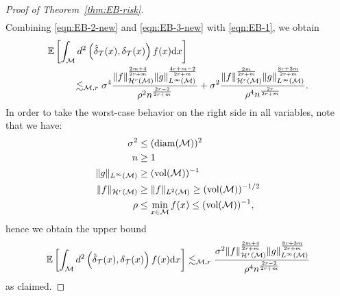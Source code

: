 \documentclass[preprint]{imsart}
\theoremstyle{plain}
\theoremstyle{definition}
\newcommand{\Ebb}{\mathbb{E}}
\newcommand{\Mcal}{\mathcal{M}}
\newcommand{\Hcal}{\mathcal{H}}
\newcommand{\diff}{\textnormal{d}}
\newcommand{\vol}{\textnormal{vol}}
\newcommand{\T}{\mathcal{T}}
\DeclareMathOperator{\diam}{diam}
\begin{document}
\begin{appendix}
\begin{proof}[Proof of Theorem~\ref{thm:EB-risk}]
\begin{equation}
\begin{split}
        \end{split}
    \end{equation}
    Combining \eqref{eqn:EB-2-new} and \eqref{eqn:EB-3-new} with \eqref{eqn:EB-1}, we obtain
    \begin{equation*}
        \begin{split}
        \Ebb&\left[\int_{\Mcal}d^2\left(\hat{\delta}_{\T}(x),\delta_{\T}(x)\right)f(x)\diff x\right] \\
        &\qquad\lesssim_{\Mcal,r}
        \sigma^4
        \frac{\|f\|_{\Hcal^{r}(\Mcal)}^{\frac{2m+4}{2r+m}}
        \|g\|_{L^{\infty}(\Mcal)}^{\frac{4r+m-2}{2r+m}}}{\rho^2n^{\frac{2r-2}{2r+m}}}
        +
        \sigma^2
        \frac{\|f\|_{\Hcal^{r}(\Mcal)}^{\frac{2m}{2r+m}}
        \|g\|_{L^{\infty}(\Mcal)}^{\frac{8r+3m}{2r+m}}}{\rho^4n^{\frac{2r}{2r+m}}}.
        \end{split}
    \end{equation*}
    In order to take the worst-case behavior on the right side in all variables, note that we have: 
    \begin{align*}
        \sigma^2 &\le (\diam(\Mcal))^2 \\
        n&\ge 1 \\
        \|g\|_{L^\infty(\Mcal)} &\ge (\vol(\Mcal))^{-1} \\
        \|f\|_{\Hcal^r(\Mcal)}&\ge \|f\|_{L^2(\Mcal)}\ge (\vol(\Mcal))^{-1/2} \\
        \rho&\le \min_{x\in\Mcal}f(x)\le (\vol(\Mcal))^{-1},
    \end{align*}
    hence we obtain the upper bound
    \begin{equation*}
        \Ebb\left[\int_{\Mcal}d^2\left(\hat{\delta}_{\T}(x),\delta_{\T}(x)\right)f(x)\diff x\right] \lesssim_{\Mcal,r} \frac{\sigma^{2}\|f\|^{\frac{2m+4}{2r+m}}_{\Hcal^{r}(\Mcal)}\|g\|^{\frac{8r+3m}{2r+m}}_{L^{\infty}(\Mcal)}}{\rho^4n^{\frac{2r-2}{2r+m}}}  \end{equation*}
    as claimed.
\end{proof} 



\end{appendix}
\end{document}
